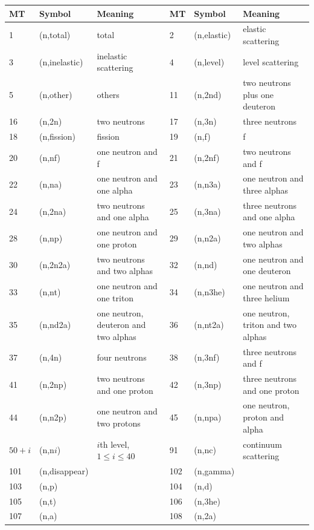 \begin{small}
\centering
\begin{longtable}{l l p{3.5cm} | l l p{3.5cm}}
MT & Symbol & Meaning & MT & Symbol & Meaning\\\hline
1 & (n,total) & total & 2 & (n,elastic) & elastic scattering\\\hline
3 & (n,inelastic) & inelastic scattering & 4 & (n,level) & level scattering\\\hline
5 & (n,other) & others & 11 & (n,2nd) & two neutrons plus one deuteron\\\hline 
16 & (n,2n) & two neutrons & 17 & (n,3n) & three neutrons\\\hline
18 & (n,fission) & fission & 19 & (n,f) & f \\\hline
20 & (n,nf) & one neutron and f & 21 & (n,2nf) & two neutrons and f\\\hline
22 & (n,na) & one neutron and one alpha & 23 & (n,n3a) & one neutron and three alphas\\\hline
24 & (n,2na) & two neutrons and one alpha & 25 & (n,3na) & three neutrons and one alpha\\\hline
28 & (n,np) & one neutron and one proton & 29 & (n,n2a) & one neutron and two alphas\\\hline
30 & (n,2n2a) & two neutrons and two alphas & 32 & (n,nd) & one neutron and one deuteron\\\hline
33 & (n,nt) & one neutron and one triton & 34 & (n,n3he) & one neutron and three helium\\\hline
35 & (n,nd2a) & one neutron, deuteron and two alphas & 36 & (n,nt2a) &  one neutron, triton and two alphas\\\hline
37 & (n,4n) & four neutrons & 38 & (n,3nf) & three neutrons and f\\\hline
41 & (n,2np) & two neutrons and one proton & 42 & (n,3np) & three neutrons and one proton\\\hline
44 & (n,n2p) & one neutron and two protons & 45 & (n,npa) & one neutron, proton and alpha\\\hline
$50+i$ & (n,n$i$) & $i$th level, $1\leq i\leq 40$ & 91 & (n,nc) & continuum scattering \\\hline
101 & (n,disappear) & & 102 & (n,gamma) & \\\hline
103 & (n,p) & & 104 & (n,d) & \\\hline
105 & (n,t) & & 106 & (n,3he) & \\\hline
107 & (n,a) & & 108 & (n,2a) & \\\hline

\end{longtable}
\end{small}
